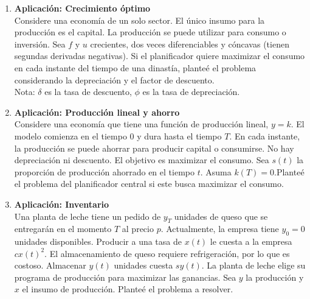 \documentclass[10pt,a4paper]{article}
\begin{document}
\begin{enumerate}
		\item \textbf{Aplicación: Crecimiento óptimo}\\
		Considere una economía de un solo sector. El único insumo para la producción es el capital. La producción se puede utilizar para consumo o inversión. Sea $f$ y $u$ crecientes, dos veces diferenciables y cóncavas (tienen segundas derivadas negativas). Si el planificador quiere maximizar el consumo en cada instante del tiempo de una dinastía, planteé el problema considerando la depreciación y el factor de descuento.\\
		Nota: $\delta$ es la tasa de descuento, $\phi$ es la tasa de depreciación.
		\item \textbf{Aplicación: Producción lineal y ahorro}\\
		Considere una economía que tiene una función de producción lineal, $y = k$. El modelo comienza en el tiempo $0$ y dura hasta el tiempo $T$. En cada instante, la producción se puede ahorrar para producir capital o consumirse. No hay depreciación ni descuento. El objetivo es maximizar el consumo. Sea $s(t)$ la proporción de producción ahorrado en el tiempo $t$. Asuma $k(T)=0$.Planteé el problema del planificador central si este busca maximizar el consumo. 
		\item \textbf{Aplicación: Inventario}\\
		Una planta de leche tiene un pedido de $ y_T $ unidades de queso que se entregarán en 
		el momento $ T $ al precio $ p $. Actualmente, la empresa tiene $ y_0 = 0 $ unidades disponibles. 
		Producir a una tasa de $ x (t) $ le cuesta a la empresa $ cx (t) ^ 2 $. El almacenamiento de queso requiere 
		refrigeración, por lo que es costoso. Almacenar $ y (t) $ unidades cuesta $ sy (t) $. La planta de leche elige su 
		programa de producción para maximizar las ganancias. Sea $y$ la producción y $x$ el insumo de producción. Planteé el problema a resolver.
		

\end{enumerate}
\end{document}
